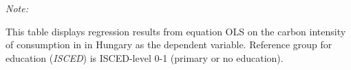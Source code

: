 \begin{table}[htbp!]
\begin{adjustbox}{width = 1\textwidth, max height = 0.95\textheight, center}
\begin{threeparttable}[b]
         \begin{tablenotes}\item \medskip \textit{Note:}
            \item This table displays regression results from equation OLS on the carbon intensity of consumption in  in Hungary as the dependent variable. Reference group for education (\textit{ISCED}) is ISCED-level 0-1 (primary or no education).
         \end{tablenotes}
      \end{threeparttable}
   \end{adjustbox}
\end{table}


